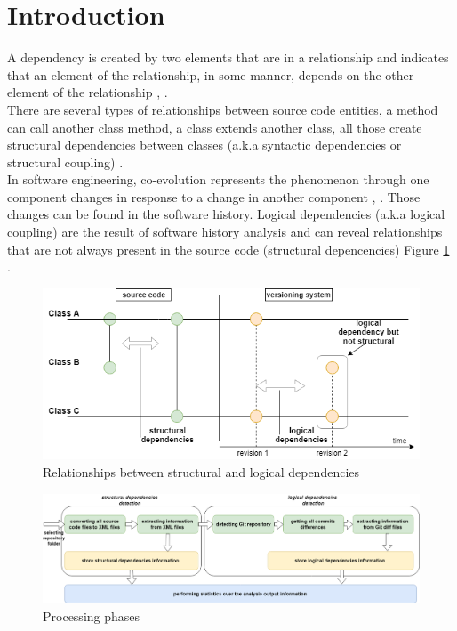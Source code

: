 \documentclass[conference,compsoc]{IEEEtran}
\begin{document}
\section{Introduction}
A dependency is created by two elements that are in a relationship and indicates that an element of the relationship, in some manner, depends on the other element of the relationship \cite{ct2}, \cite{ct3}. \\There are several types of relationships between source code entities, a method can call another class method, a class extends another class, all those create structural dependencies between classes (a.k.a syntactic dependencies or structural coupling) \cite{ct4}.\\In software engineering, co-evolution represents the phenomenon through one component changes in response to a change in another component \cite{ct6}, \cite{ct5}. Those changes can be found in the software history. Logical dependencies (a.k.a logical coupling) are the result of software history analysis and can reveal relationships that are not always present in the source code (structural depencencies)  Figure \ref{fig:fig1} .
\begin{figure}[h]
\includegraphics[scale=0.45]{fig1.png}
\caption{Relationships between structural and logical dependencies }
\label{fig:fig1}
\centering
\end{figure}
\begin{figure}[h]
\centering
\includegraphics[width=\textwidth]{fig3.png}
\caption{Processing phases}
\label{fig:fig3}
\end{figure}
\end{document}
